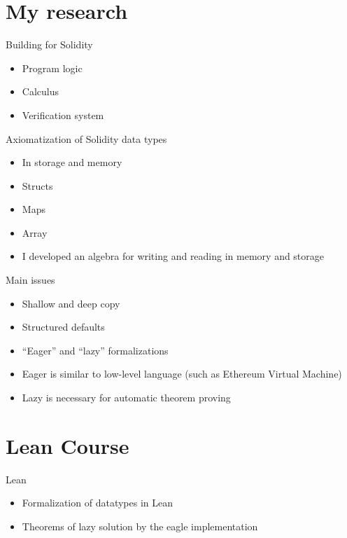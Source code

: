\documentclass[bigger]{beamer}
\begin{document}
\section{My research}
\label{sec:orgeb9aab9}
\begin{frame}[label={sec:orgcb4e961}]{Building for Solidity}
\begin{itemize}
\item Program logic
\item Calculus
\item Verification system
\end{itemize}
\end{frame}
\begin{frame}[label={sec:org26d441d}]{Axiomatization of Solidity data types}
\begin{itemize}
\item In storage and memory
\item Structs
\item Maps
\item Array
\item I developed an algebra for writing and reading in memory and storage
\end{itemize}
\end{frame}
\begin{frame}[label={sec:orgff3427a}]{Main issues}
\begin{itemize}
\item Shallow and deep copy
\item Structured defaults
\item ``Eager'' and ``lazy'' formalizations
\item Eager is similar to low-level language (such as Ethereum Virtual Machine)
\item Lazy is necessary for automatic theorem proving
\end{itemize}
\end{frame}
\section{Lean Course}
\label{sec:orgbcb7abd}
\begin{frame}[label={sec:org680c45b}]{Lean}
\begin{itemize}
\item Formalization of datatypes in Lean
\item Theorems of lazy solution by the eagle implementation
\end{itemize}
\end{frame}
\end{document}
